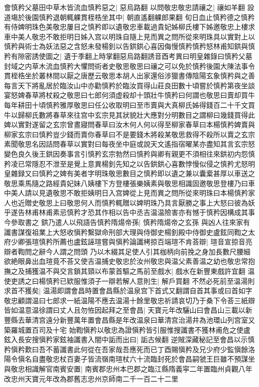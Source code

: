 會慎矜父墓田中草木皆流血慎矜惡之|{
	惡烏路翻}
以問敬忠敬忠請禳之|{
	禳如羊翻}
設道塲於後園慎矜退朝輒躶貫桎梏坐其中|{
	朝直遙翻躶郎果翻}
旬日血止慎矜德之慎矜有侍婢明珠色美敬忠屢目之慎矜即以遺敬忠車載過貴妃姊柳氏樓下姊邀敬忠上樓求車中美人敬忠不敢拒明日姊入宫以明珠自隨上見而異之問所從來明珠具以實對上以慎矜與術士為妖法惡之含怒未發楊釗以告鉷鉷心喜因侮慢慎矜慎矜怒林甫知鉷與慎矜有隙密誘使圖之|{
	遺于季翻上時掌翻惡烏路翻誘音酉考異曰明皇雜錄曰慎矜父墓封域之内草木流血慎矜大懼問術者史敬思敬思曰禳之可以免於慎矜後園大陳法事令貫桎梏坐於叢林間以厭之唐歷云敬思本胡人出家還俗涉獵書傳陰陽玄象慎矜與之善每言天下將亂居於臨汝山中亦勸慎矜於臨汝買得山莊良田數十頃嘗於慎矜第夜坐談宴怒婢春草將杖殺之敬思曰七郎何須虚殺却十頭壯牛慎矜曰何謂也敬思曰賣却買牛每年耕田十頃慎矜雅厚敬思曰任公收取明曰至市賣與大真柳氏姊得錢百二十千文買牛以歸柳氏數將春草來往宫中玄宗見其狀貌壯大應對分明數目之謂柳曰幾錢買得此婢以實對遂留之玄宗曾晝寢問春草曰汝木何人何以得至柳家春草曰本楊慎矜婢賣與柳家玄宗曰慎矜豈少錢而賣你春草曰不是要錢木將殺某敬思救得不殺所以賣之玄宗素聞敬思名因詰問春草以實對曰每夜坐中庭或說天文遙指宿曜某亦盡知其言玄宗怒變色良久後王鉷因奏事言引慎矜玄宗勃然曰慎矜與卿有親更不須相往來鉷初内怨慎矜凌已常隱忍不泄至是覺上意異楊釗先知之以告鉷鉷心喜數悖慢似侵之慎矜尤怒明皇雜録又曰慎矜之婢有美者字明珠敬思數目之慎矜即以遺之兼以囊槖甚厚以車送之敬思乘馬隨之路經貴妃妹八姨樓下方登樓張樂姨素與敬思相識固邀敬思登樓乃曰車中美人請以見遺敬思不敢拒姨明日入宫婢從上見而異之問所從來明珠曰本楊慎矜家人也近贈史敬思上曰敬思何人而慎矜輒贈以婢明珠乃具言厭勝之事上大怒曰彼為妖乎遂告林甫林甫素忌慎矜才恐其作相以告中丞吉温温險害亦有憾于慎矜因構成其事今參取書之}
鉷乃遣人以飛語告慎矜隋煬帝孫|{
	慎矜隋煬帝之玄孫}
與凶人往來家有讖書謀復祖業上大怒收愼矜繫獄命刑部大理與侍御史楊釗殿中侍御史盧鉉同鞫之太府少卿張瑄慎矜所薦也盧鉉誣瑄嘗與愼矜論讖栲掠百端瑄不肯荅辯|{
	瑄音宣掠音亮辯者鞫問之辭今人謂之問頭}
乃以木綴其足使人引其枷柄向前挽之身加長數尺腰細欲絶眼鼻出血瑄竟不荅又使吉温捕史敬忠於汝州敬忠與温父素善温之幼也敬忠常抱撫之及捕獲温不與交言鎖其頸以布蒙首驅之馬前至戲水|{
	戲水在新豐東戲許宜翻}
温使吏誘之曰楊慎矜已欵服惟須子一辯若解人意則生|{
	解戶買翻}
不然必死前至温湯則求首不獲矣|{
	温湯即謂會昌時置會昌縣於温泉宫下首式又翻謂自首其事或曰首如字}
敬忠顧謂温曰七郎求一紙温陽不應去温湯十餘里敬忠祈請哀切乃于桑下令荅三紙辯皆如温意温徐謂曰丈人且勿恠因起拜之至會昌|{
	天寶元年改驪山曰會昌山三載以新豐縣去華清宫遠分新豐萬年置會昌縣是年改温泉曰華清宫治湯井為池環山列宫室又築羅城置百司及十宅}
始鞫愼矜以敬忠為證愼矜皆引服惟搜讖書不獲林甫危之使盧鉉入長安搜愼矜家鉉袖讖書入闇中詬而出曰|{
	詬古候翻}
逆賊深藏秘記至會昌以示慎矜愼矜歎曰吾不蓄讖書此何從在吾家哉吾應死而已丁酉賜愼矜及兄少府少監愼餘洛陽令愼名自盡敬忠杖百妻子皆流嶺南瑄杖六十流臨封死於會昌嗣虢王巨雖不預謀坐與敬忠相識解官南賓安置|{
	南賓郡忠州本巴郡之臨江縣隋義寜二年置臨州貞觀八年改忠州天寶元年改為郡舊志忠州京師南二千一百二十二里}

